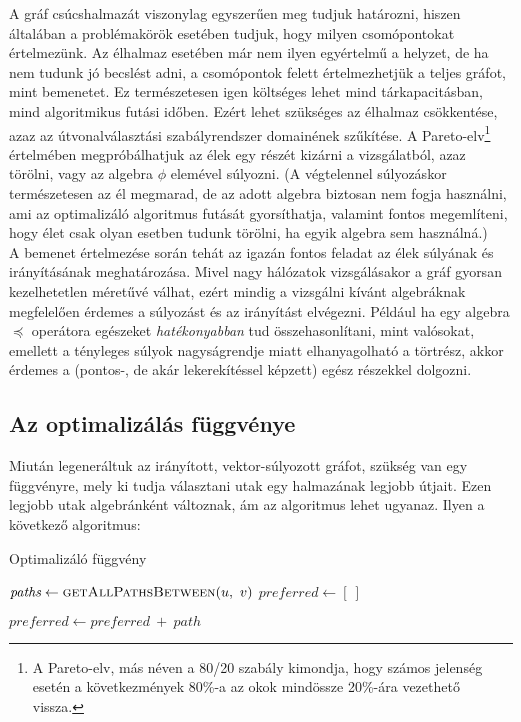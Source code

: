       A gráf csúcshalmazát viszonylag egyszerűen meg tudjuk határozni, hiszen általában a problémakörök esetében tudjuk, hogy milyen csomópontokat értelmezünk. Az élhalmaz esetében már nem ilyen egyértelmű a helyzet, de ha nem tudunk jó becslést adni, a csomópontok felett értelmezhetjük a teljes gráfot, mint bemenetet. Ez természetesen igen költséges lehet mind tárkapacitásban, mind algoritmikus futási időben. Ezért lehet szükséges az élhalmaz csökkentése, azaz az útvonalválasztási szabályrendszer domainének szűkítése. A Pareto-elv\footnote{A Pareto-elv, más néven a 80/20 szabály kimondja, hogy számos jelenség esetén a következmények 80\%-a az okok mindössze 20\%-ára vezethető vissza.} értelmében megpróbálhatjuk az élek egy részét kizárni a vizsgálatból, azaz törölni, vagy az algebra $\phi$ elemével súlyozni. (A végtelennel súlyozáskor természetesen az él megmarad, de az adott algebra biztosan nem fogja használni, ami az optimalizáló algoritmus futását gyorsíthatja, valamint fontos megemlíteni, hogy élet csak olyan esetben tudunk törölni, ha egyik algebra sem használná.)\\

      A bemenet értelmezése során tehát az igazán fontos feladat az élek súlyának és irányításának meghatározása. Mivel nagy hálózatok vizsgálásakor a gráf gyorsan kezelhetetlen méretűvé válhat, ezért mindig a vizsgálni kívánt algebráknak megfelelően érdemes a súlyozást és az irányítást elvégezni. Például ha egy algebra $\preceq$ operátora egészeket \textit{hatékonyabban} tud összehasonlítani, mint valósokat, emellett a tényleges súlyok nagyságrendje miatt elhanyagolható a törtrész, akkor érdemes a (pontos-, de akár lekerekítéssel képzett) egész részekkel dolgozni.

      \subsection{Az optimalizálás függvénye}
      Miután legeneráltuk az irányított, vektor-súlyozott gráfot, szükség van egy függvényre, mely ki tudja választani utak egy halmazának legjobb útjait. Ezen legjobb utak algebránként változnak, ám az algoritmus lehet ugyanaz. Ilyen a következő algoritmus:

      \begin{algorithm}
        \caption{Optimalizáló függvény}\label{algo_optimalizalo}
        \begin{algorithmic}[1]
            \State $\textit{paths} \gets \Call{getAllPathsBetween}{u,~v}$
            \State $\textit{preferred} \gets [~]$

                \State $\textit{preferred} \gets \textit{preferred}~+~path$
              \EndIf
            \EndFor
          \EndProcedure
        \end{algorithmic}
      \end{algorithm}

